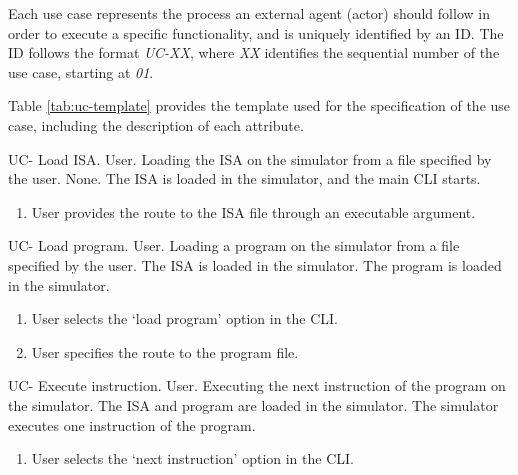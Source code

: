 
Each use case represents the process an external agent (actor) should follow in order to execute a specific functionality, and is uniquely identified by an ID. The ID follows the format \textit{UC-XX}, where \textit{XX} identifies the sequential number of the use case, starting at \textit{01}.

Table \ref{tab:uc-template} provides the template used for the specification of the use case, including the description of each attribute.



\setcounter{i}{1}

\begin{useCase}{UC-}
  {Load \gls{ISA}.}  %
  {User.}  %
  {Loading the \gls{ISA} on the simulator from a file specified by the user.}  %
  {None.}  %
  {The \gls{ISA} is loaded in the simulator, and the main \gls{CLI} starts.}  %
  \begin{enumerate}[nosep]  %
    \item User provides the route to the \gls{ISA} file through an executable argument.
  \end{enumerate}
\end{useCase}

\begin{useCase}{UC-}
  {Load program.}  %
  {User.}  %
  {Loading a program on the simulator from a file specified by the user.}  %
  {The \gls{ISA} is loaded in the simulator.}  %
  {The program is loaded in the simulator.}  %
  \begin{enumerate}[nosep]  %
    \item User selects the `load program' option in the \gls{CLI}.
    \item User specifies the route to the program file.
  \end{enumerate}
\end{useCase}

\begin{useCase}{UC-}
  {Execute instruction.}  %
  {User.}  %
  {Executing the next instruction of the program on the simulator.}  %
  {The \gls{ISA} and program are loaded in the simulator.}  %
  {The simulator executes one instruction of the program.}  %
  \begin{enumerate}[nosep]  %
    \item User selects the `next instruction' option in the \gls{CLI}.
  \end{enumerate}
\end{useCase}

